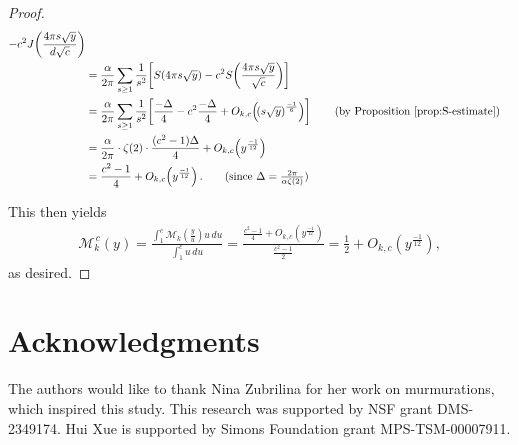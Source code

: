 \documentclass[12pt,letterpaper,reqno]{amsart}
\theoremstyle{plain}
\theoremstyle{definition}
\numberwithin{equation}{section}
\numberwithin{figure}{section}
\numberwithin{table}{section}
\newcommand{\lrp}[1]{\!\left(#1\right)}
\newcommand{\lrb}[1]{\!\left[#1\right]}
\newcommand{\M}{\mathcal{M}}
\begin{document}
\begin{proof}
\begin{align}
{-
c^2
J\lrp{\frac{4\pi s\sqrt y}{d\sqrt c}}
}
\\
&=
\frac{\alpha}{2\pi}
\sum_{s\ge1}\frac{1}{s^2}
\lrb{
    S\lrp{4\pi s\sqrt y}
    -
    c^2S\lrp{\frac{4\pi s \sqrt y}{\sqrt c}}
} \\
&=
\frac{\alpha}{2\pi}
\sum_{s\ge1}\frac{1}{s^2}
\lrb{
    \frac{-\Delta}{4} 
    - c^2 \frac{-\Delta}{4}
    +O_{k,c}\lrp{\lrp{s \sqrt y}^{\frac{-1}{6}}}
} 
\qquad \text{(by Proposition \ref{prop:S-estimate})}
\\
&=
\frac{\alpha}{2\pi} \cdot \zeta(2) \cdot \frac{(c^2-1)\Delta}{4} + O_{k,c}\lrp{y^\frac{-1}{12}} \\
&= 
\frac{c^2-1}{4}
+O_{k,c}\lrp{y^{\frac{-1}{12}}}. \qquad \text{(since $\textstyle \Delta = \frac{2\pi}{\alpha \zeta(2)}$)}
\end{align}

This then yields
\begin{align}
    \M_k^{\,c}(y)
    =
    \frac{
        \displaystyle
        \int_1^c
        \M_k\lrp{\frac{y}{u}}u\,du
    }{
        \displaystyle
        \int_1^c u\,du
    }
    =
    \frac{
        \displaystyle
        \frac{c^2-1}{4}
        +O_{k,c}\lrp{y^{\frac{-1}{12}}}
    }{
        \displaystyle
        \frac{c^2-1}{2}
    }
    =
    \frac12
    +
    O_{k,c}\lrp{y^{\frac{-1}{12}}},
\end{align}
as desired.
\end{proof}







\section*{Acknowledgments}
The authors would like to thank Nina Zubrilina for her work on murmurations, which inspired this study. This research was supported by NSF grant DMS-2349174. Hui Xue is supported by Simons Foundation grant MPS-TSM-00007911.





\end{document}
